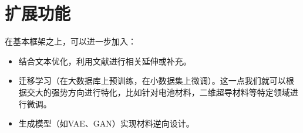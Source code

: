 \documentclass[12pt,a4paper]{article}
\begin{document}
\section{扩展功能}
在基本框架之上，可以进一步加入：
\begin{itemize}
    \item 结合文本优化，利用文献进行相关延伸或补充。
    \item 迁移学习（在大数据库上预训练，在小数据集上微调）。这一点我们就可以根据交大的强势方向进行特化，比如针对电池材料，二维超导材料等特定领域进行微调。
    \item 生成模型（如VAE、GAN）实现材料逆向设计。
\end{itemize}
\end{document}
